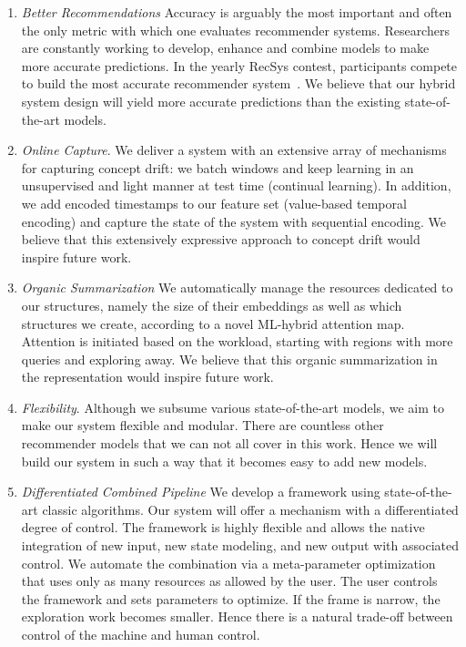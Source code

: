 \begin{enumerate}
    \item \emph{Better Recommendations}
    Accuracy is arguably the most important and often the only metric with which one evaluates recommender systems. Researchers are constantly working to develop, enhance and combine models to make more accurate predictions. In the yearly RecSys contest, participants compete to build the most accurate recommender system~\cite{recsyschallenge}.
    We believe that our hybrid system design will yield more accurate predictions than the existing state-of-the-art models.


    \item \emph{Online Capture}. We deliver a system with an extensive array of mechanisms for capturing concept drift: we batch windows and keep learning in an unsupervised and light manner at test time (continual learning). In addition, we add encoded timestamps to our feature set (value-based temporal encoding) and capture the state of the system with sequential encoding.
    We believe that this extensively expressive approach to concept drift would inspire future work.


    \item \emph{Organic Summarization} We automatically manage the resources dedicated to our structures, namely the size of their embeddings as well as which structures we create, according to a novel ML-hybrid attention map. Attention is initiated based on the workload, starting with regions with more queries and exploring away.
    We believe that this organic summarization in the representation would inspire future work.
    
    
    \item \emph{Flexibility}.
    Although we subsume various state-of-the-art models, we aim to make our system flexible and modular. There are countless other recommender models that we can not all cover in this work. Hence we will build our system in such a way that it becomes easy to add new models.
    
    
    \item \emph{Differentiated Combined Pipeline} We develop a framework using state-of-the-art classic algorithms. Our system will offer a mechanism with a differentiated degree of control. The framework is highly flexible and allows the native integration of new input, new state modeling, and new output with associated control. We automate the combination via a meta-parameter optimization that uses only as many resources as allowed by the user. The user controls the framework and sets parameters to optimize. If the frame is narrow, the exploration work becomes smaller. Hence there is a natural trade-off between control of the machine and human control.

\end{enumerate}


